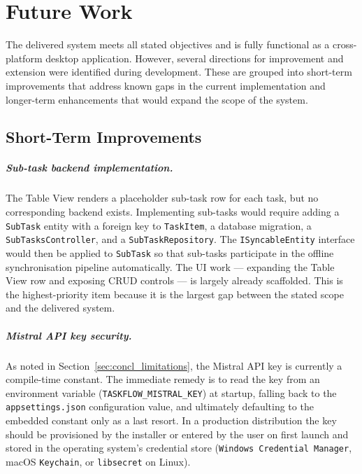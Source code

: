 ﻿\chapter{Future Work}\label{chap:todo}

The delivered system meets all stated objectives and is fully functional as a
cross-platform desktop application.
However, several directions for improvement and extension were identified
during development.
These are grouped into short-term improvements that address known gaps in the current
implementation and longer-term enhancements that would expand the scope of the system.

\section{Short-Term Improvements}\label{sec:fw_shortterm}

\paragraph{Sub-task backend implementation.}
The Table View renders a placeholder sub-task row for each task, but no corresponding
backend exists.
Implementing sub-tasks would require adding a \texttt{SubTask} entity with a foreign
key to \texttt{TaskItem}, a database migration, a \texttt{SubTasksController}, and a
\texttt{SubTaskRepository}.
The \texttt{ISyncableEntity} interface would then be applied to \texttt{SubTask} so
that sub-tasks participate in the offline synchronisation pipeline automatically.
The UI work --- expanding the Table View row and exposing CRUD controls --- is largely
already scaffolded.
This is the highest-priority item because it is the largest gap between the stated
scope and the delivered system.

\paragraph{Mistral API key security.}
As noted in Section~\ref{sec:concl_limitations}, the Mistral API key is currently a
compile-time constant.
The immediate remedy is to read the key from an environment variable
(\texttt{TASKFLOW\_}\cbrk\texttt{MISTRAL\_KEY}) at startup, falling back to the
\texttt{appsettings.json} configuration value, and ultimately defaulting to the
embedded constant only as a last resort.
In a production distribution the key should be provisioned by the installer or entered
by the user on first launch and stored in the operating system's credential store
(\texttt{Windows Credential Manager}, macOS \texttt{Keychain}, or \texttt{libsecret}
on Linux).


